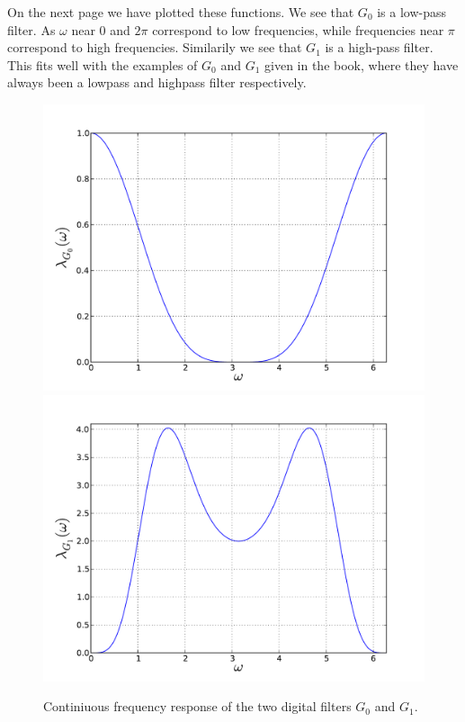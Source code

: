 \documentclass[a4paper, 11pt, notitlepage, english]{article}
\begin{document}
On the next page we have plotted these functions. We see that $G_0$ is a low-pass filter. As $\omega$ near 0 and $2\pi$ correspond to low frequencies, while frequencies near $\pi$ correspond to high frequencies. Similarily we see that $G_1$ is a high-pass filter. This fits well with the examples of $G_0$ and $G_1$ given in the book, where they have always been a lowpass and highpass filter respectively.

\begin{figure}
    \centering
    \includegraphics[width=\textwidth]{g0.pdf}
    \includegraphics[width=\textwidth]{g1.pdf}
    \caption{Continiuous frequency response of the two digital filters $G_0$ and $G_1$.}
\end{figure}
\end{document}
